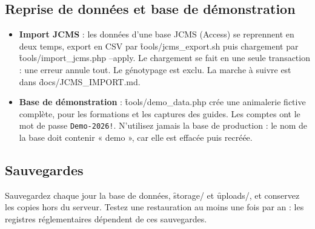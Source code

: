 \documentclass[11pt,a4paper]{article}
\begin{document}
\subsection{Reprise de données et base de démonstration}
\begin{itemize}
  \item \textbf{Import JCMS} : les données d'une base JCMS (Access) se
    reprennent en deux temps, export en CSV par \f{tools/jcms_export.sh}
    puis chargement par \f{tools/import_jcms.php --apply}. Le chargement se
    fait en une seule transaction : une erreur annule tout. Le génotypage est
    exclu. La marche à suivre est dans \f{docs/JCMS_IMPORT.md}.
  \item \textbf{Base de démonstration} : \f{tools/demo_data.php} crée une
    animalerie fictive complète, pour les formations et les captures des
    guides. Les comptes ont le mot de passe \texttt{Demo-2026!}. N'utilisez
    jamais la base de production : le nom de la base doit contenir « demo »,
    car elle est effacée puis recréée.
\end{itemize}

\subsection{Sauvegardes}
Sauvegardez chaque jour la base de données, \f{storage/} et \f{uploads/}, et
conservez les copies hors du serveur. Testez une restauration au moins une
fois par an : les registres réglementaires dépendent de ces sauvegardes.
\end{document}

